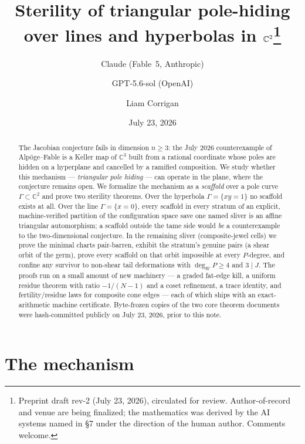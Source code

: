 \documentclass[11pt]{article}
\title{Sterility of triangular pole-hiding\\ over lines and hyperbolas in $\C^2$\thanks{Preprint draft rev-2 (July 23, 2026), circulated for review. Author-of-record and venue are being finalized; the mathematics was derived by the AI systems named in \S7 under the direction of the human author. Comments welcome.}}
\author{Claude (Fable~5, Anthropic) \and GPT-5.6-sol (OpenAI) \and Liam Corrigan}
\date{July 23, 2026}
\newcommand{\C}{\mathbb{C}}
\begin{document}
\maketitle

\begin{abstract}
The Jacobian conjecture fails in dimension $n \ge 3$: the July 2026
counterexample of Alp\"oge--Fable is a Keller map of $\C^3$ built from a
rational coordinate whose poles are hidden on a hyperplane and cancelled by a
ramified composition. We study whether this mechanism --- \emph{triangular
pole hiding} --- can operate in the plane, where the conjecture remains open.
We formalize the mechanism as a \emph{scaffold} over a pole curve
$\Gamma \subset \C^2$ and prove two sterility theorems. Over the hyperbola
$\Gamma = \{xy = 1\}$ no scaffold exists at all. Over the line
$\Gamma = \{x = 0\}$, every scaffold in every stratum of an explicit,
machine-verified partition of the configuration space save one named sliver is
an affine triangular automorphism; a scaffold outside the tame side would
\emph{be} a counterexample to the two-dimensional conjecture. In the remaining
sliver (composite-jewel cells) we prove the minimal charts pair-barren,
exhibit the stratum's genuine pairs (a shear orbit of the germ), prove every
scaffold on that orbit impossible at every $P$-degree, and confine any
survivor to non-shear tail deformations with $\deg_W P \ge 4$ and
$3 \mid J$. The proofs run on a small amount of new machinery --- a graded
fat-edge kill, a uniform residue theorem with ratio $-1/(N-1)$ and a coset
refinement, a trace identity, and fertility/residue laws for composite cone
edges --- each of which ships with an exact-arithmetic machine certificate.
Byte-frozen copies of the two core theorem documents were hash-committed
publicly on July 23, 2026, prior to this note.
\end{abstract}

\section{The mechanism}
\end{document}
